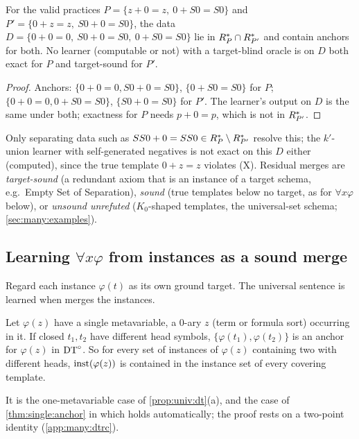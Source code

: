 \begin{proposition}\label{prop:many:ambiguity}
For the valid practices $P=\{z+0=z,\ 0+S0=S0\}$ and $P'=\{0+z=z,\ S0+0=S0\}$, the data $D=\{0+0=0,\ S0+0=S0,\
0+S0=S0\}$ lie in $R^{*}_P\cap R^{*}_{P'}$ and contain anchors for both. No learner (computable or not) with a
target-blind oracle is on $D$ both exact for $P$ and target-sound for $P'$.
\end{proposition}
\begin{proof}
Anchors: $\{0+0=0,S0+0=S0\}$, $\{0+S0=S0\}$ for $P$; $\{0+0=0,0+S0=S0\}$, $\{S0+0=S0\}$ for $P'$. The learner's output on
$D$ is the same under both; exactness for $P$ needs $p+0=p$, which is not in $R^{*}_{P'}$.
\end{proof}
Only separating data such as $SS0+0=SS0\in R^{*}_P\setminus R^{*}_{P'}$ resolve this; the $k'$-union learner with
self-generated negatives is not exact on this $D$ either (computed), since the true template $0+z=z$ violates (X).
Residual merges are \emph{target-sound} (a redundant axiom that is an instance of a target schema, e.g.\ Empty Set of
Separation), \emph{sound} (true templates below no target, as for $\forall x\varphi$ below), or \emph{unsound unrefuted}
($K_0$-shaped templates, the universal-set schema; \cref{sec:many:examples}).

\subsection{Learning \texorpdfstring{$\forall x\varphi$}{forall x phi} from instances as a sound merge}\label{sec:many:forall}

Regard each instance $\varphi(t)$ as its own ground target. The universal sentence is learned when \DTRC{} merges the
instances.

\begin{lemma}[two-point anchors]\label{lem:many:twopoint}
Let $\varphi(z)$ have a single metavariable, a 0-ary $z$ (term or formula sort) occurring in it. If closed $t_1,t_2$ have
different head symbols, $\{\varphi(t_1),\varphi(t_2)\}$ is an anchor for $\varphi(z)$ in $\mathrm{DT}^{\circ}$. So for every set of
instances of $\varphi(z)$ containing two with different heads, $\mathrm{inst}(\varphi(z))$ is contained in the instance set of every
covering template.
\end{lemma}
\noindent It is the one-metavariable case of \cref{prop:univ:dt}(a), and the case of \cref{thm:single:anchor} in which
\evU{} holds automatically; the proof rests on a two-point identity (\cref{app:many:dtrc}).

